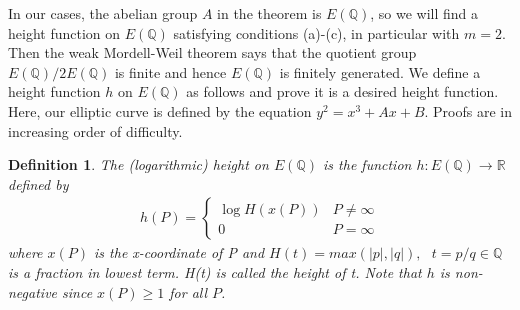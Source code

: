 \documentclass[11pt]{article}
\newcommand{\<}{\langle}
\renewcommand{\>}{\rangle}
\numberwithin{equation}{section}
\theoremstyle{plain}
\newtheorem{defn}[thm]{Definition}
\theoremstyle{definition}
\begin{document}
In our cases, the abelian group \(A\) in the theorem is \(E(\mathbb{Q})\), so we will find a height function on \(E(\mathbb{Q})\) satisfying conditions (a)-(c), in particular with \(m=2\). Then the weak Mordell-Weil theorem says that the quotient group \(E(\mathbb{Q})/2E(\mathbb{Q})\) is finite and hence \(E(\mathbb{Q})\) is finitely generated. We define a height function \(h\) on \(E(\mathbb{Q})\) as follows and prove it is a desired height function. Here, our elliptic curve is defined by the equation \(y^2= x^3 + Ax +B \). Proofs are in increasing order of difficulty.

\begin{defn} The (logarithmic) height on \(E(\mathbb{Q})\) is the function \(h : E(\mathbb{Q}) \rightarrow \mathbb{R}\) defined by 
    \begin{align*}
        h(P) =  \begin{cases} 
                        \log H(x(P)) & P \ne \infty \\
                        0 & P = \infty 
                   \end{cases}
    \end{align*}
    where \( x(P) \) is the x-coordinate of P and \(H(t) = max( \lvert p \rvert , \lvert q \rvert), \text{ } t=p/q \in \mathbb{Q}\) is a fraction in lowest term. H(t) is called the height of t. Note that \(h\) is non-negative since \(x(P) \geq 1\) for all \(P\).
\end{defn}
\end{document}
